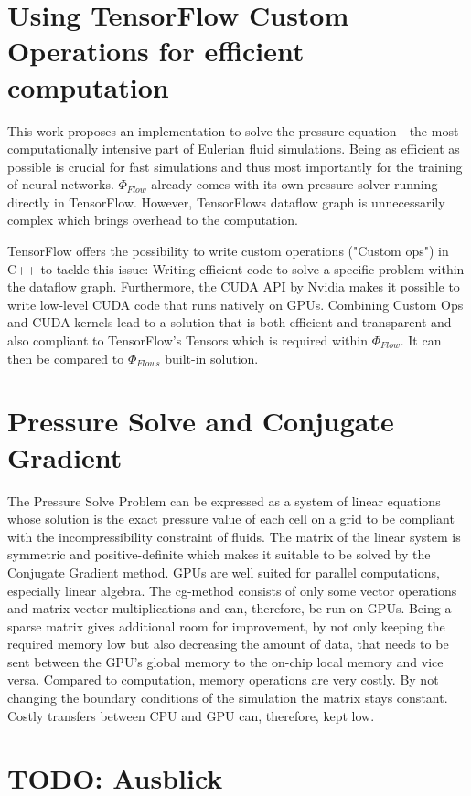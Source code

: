 \section{Using TensorFlow Custom Operations for efficient computation}
This work proposes an implementation to solve the pressure equation - the most computationally intensive part of Eulerian fluid simulations. Being as efficient as possible is crucial for fast simulations and thus most importantly for the training of neural networks. $\Phi_\textit{Flow}$ already comes with its own pressure solver running directly in TensorFlow. However, TensorFlows dataflow graph is unnecessarily complex which brings overhead to the computation.
\par TensorFlow offers the possibility to write custom operations ("Custom ops") in C++ to tackle this issue: Writing efficient code to solve a specific problem within the dataflow graph. Furthermore, the CUDA API by Nvidia makes it possible to write low-level CUDA code that runs natively on GPUs. Combining Custom Ops and CUDA kernels lead to a solution that is both efficient and transparent and also compliant to TensorFlow's Tensors which is required within $\Phi_\textit{Flow}$. It can then be compared to $\Phi_\textit{Flows}$ built-in solution.
\section{Pressure Solve and Conjugate Gradient}
The Pressure Solve Problem can be expressed as a system of linear equations whose solution is the exact pressure value of each cell on a grid to be compliant with the incompressibility constraint of fluids. The matrix of the linear system is symmetric and positive-definite which makes it suitable to be solved by the Conjugate Gradient method. GPUs are well suited for parallel computations, especially linear algebra. The cg-method consists of only some vector operations and matrix-vector multiplications and can, therefore, be run on GPUs. Being a sparse matrix gives additional room for improvement, by not only keeping the required memory low but also decreasing the amount of data, that needs to be sent between the GPU's global memory to the on-chip local memory and vice versa. Compared to computation, memory operations are very costly. By not changing the boundary conditions of the simulation the matrix stays constant. Costly transfers between CPU and GPU can, therefore, kept low.
\section{TODO: Ausblick}